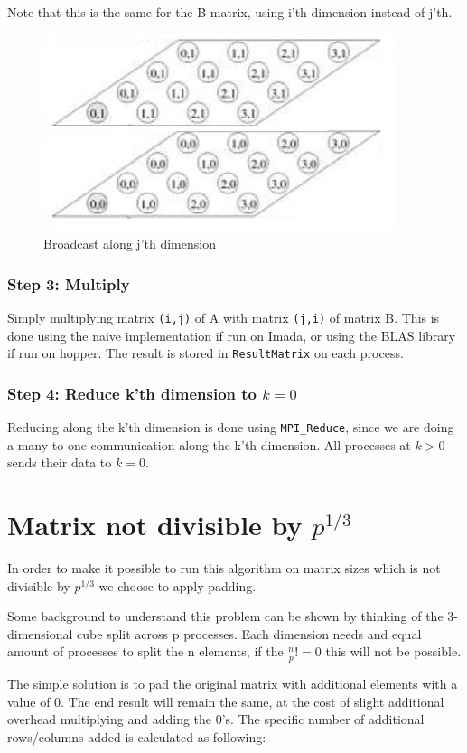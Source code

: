 \documentclass[a4paper,11pt,oneside]{book}
\begin{document}
Note that this is the same for the B matrix, using i'th dimension instead of j'th.

\begin{figure}[H]
  \centering
  \includegraphics[width=0.5\linewidth]{dns3.jpg}
  \caption{Broadcast along j'th dimension}
  \centering
  \label{fig:sub1}
\end{figure}

\subsubsection*{Step 3: Multiply}
Simply multiplying matrix \verb!(i,j)! of A with matrix \verb!(j,i)! of matrix B. This is done using the naive implementation if run on Imada, or using the BLAS library if run on hopper. The result is stored in \verb!ResultMatrix! on each process.

\subsubsection*{Step 4: Reduce k'th dimension to $k=0$}
Reducing along the k'th dimension is done using \verb!MPI_Reduce!, since we are doing a many-to-one communication along the k'th dimension. All processes at $k>0$ sends their data to $k=0$. 

\section{Matrix not divisible by $p^{1/3}$}
In order to make it possible to run this algorithm on matrix sizes which is not divisible by $p^{1/3}$ we choose to apply padding.

Some background to understand this problem can be shown by thinking of the 3-dimensional cube split across p processes. Each dimension needs and equal amount of processes to split the n elements, if the $\frac{n}{p} != 0$ this will not be possible.

The simple solution is to pad the original matrix with additional elements with a value of 0. The end result will remain the same, at the cost of slight additional overhead multiplying and adding the 0's. The specific number of additional rows/columns added is calculated as following:
\end{document}
